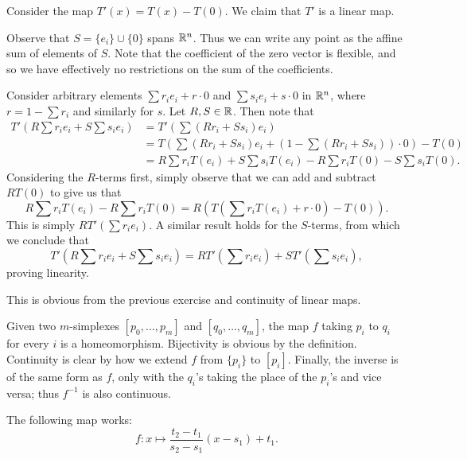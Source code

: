 \documentclass[../../solutions.tex]{subfiles}
\begin{document}
\begin{exercise} \leavevmode
Consider the map $T'(x)=T(x)-T(0)$. We claim that $T'$ is a linear map. 

Observe that $S=\{e_i\}\cup\{0\}$ spans $\mathbb{R}^n$. Thus we can write any point as the affine sum of elements of $S$. Note that the coefficient of the zero vector is flexible, and so we have effectively no restrictions on the sum of the coefficients. 

Consider arbitrary elements $\sum r_ie_i+r\cdot0$ and $\sum s_ie_i+s\cdot0$ in $\mathbb{R}^n$, where $r=1-\sum r_i$ and similarly for $s$. Let $R,S\in\mathbb{R}$. Then note that \begin{align*}T'\left(R\sum r_ie_i+S\sum s_ie_i\right)&=T'\left(\sum(Rr_i+Ss_i)e_i\right)\\&= T\left(\sum(Rr_i+Ss_i)e_i+\left(1-\sum(Rr_i+Ss_i)\right)\cdot0\right)-T(0)\\&=R\sum r_iT(e_i)+S\sum s_iT(e_i)-R\sum r_iT(0)-S\sum s_iT(0).\end{align*} Considering the $R$-terms first, simply observe that we can add and subtract $RT(0)$ to give us that \[R\sum r_iT(e_i)-R\sum r_iT(0)=R\left(T\left(\sum r_i T(e_i)+r\cdot0\right)-T(0)\right).\] This is simply $RT'\left(\sum r_ie_i\right)$. A similar result holds for the $S$-terms, from which we conclude that \[T'\left(R\sum r_ie_i+S\sum s_ie_i\right)=RT'\left(\sum r_ie_i\right)+ST'\left(\sum s_ie_i\right),\] proving linearity. 
\end{exercise} 

\begin{exercise} \leavevmode
This is obvious from the previous exercise and continuity of linear maps. 
\end{exercise} 

\begin{exercise} \leavevmode
Given two $m$-simplexes $[p_0,\dots,p_m]$ and $[q_0,\dots,q_m]$, the map $f$ taking $p_i$ to $q_i$ for every $i$ is a homeomorphism. Bijectivity is obvious by the definition. Continuity is clear by how we extend $f$ from $\{p_i\}$ to $[p_i]$. Finally, the inverse is of the same form as $f$, only with the $q_i$'s taking the place of the $p_i$'s and vice versa; thus $f^{-1}$ is also continuous. 
\end{exercise} 

\begin{exercise} \leavevmode
The following map works: \[f:x\mapsto\frac{t_2-t_1}{s_2-s_1}(x-s_1)+t_1.\] 
\end{exercise} 
\end{document}
